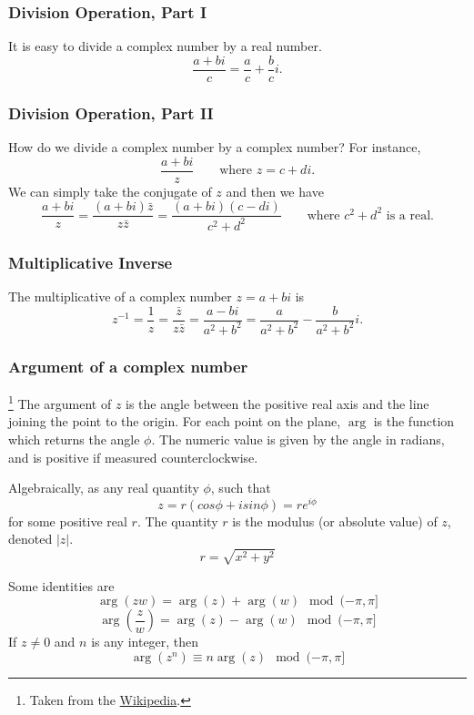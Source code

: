 \documentclass[11pt]{article}
\begin{document}
    \subsubsection{Division Operation, Part I}
    It is easy to divide a complex number by a real number. \[\frac{a+bi}{c} = \frac{a}{c} + \frac{b}{c} i.\]

    \subsubsection{Division Operation, Part II}
    How do we divide a complex number by a complex number? For instance, \[\frac{a+bi}{z} \qquad \text{where } z = c + di.\] We can simply take the conjugate of $z$ and then we have \[\frac{a + bi}{z} = \frac{(a+bi)\bar{z}}{z \bar{z}} = \frac{(a+bi)(c-di)}{c^2 + d^2} \qquad \text{where } c^2 + d^2 \text{ is a real.}\]

    \subsubsection{Multiplicative Inverse}

    The multiplicative of a complex number \(z = a + bi\) is \[z^{-1} = \frac{1}{z} = \frac{\bar{z}}{z \bar{z}} = \frac{a - bi}{a^2 + b^2} = \frac{a}{a^2 + b^2} - \frac{b}{a^2 + b^2}i.\]

    \subsubsection{Argument of a complex number}\footnote{Taken from the \href{https://en.wikipedia.org/wiki/Argument_(complex_analysis)}{Wikipedia}.}
    The argument of $z$ is the angle between the positive real axis and the line joining the point to the origin. For each point on the plane, \(\arg\) is the function which returns the angle \(\phi\). The numeric value is given by the angle in radians, and is positive if measured counterclockwise.

    Algebraically, as any real quantity \(\phi\), such that \[z = r(cos \phi + i sin \phi) = r e^{i \phi}\] for some positive real $r$. The quantity $r$ is the modulus (or absolute value) of $z$, denoted $|z|$. \[r = \sqrt{x^2 + y^2}\]

    Some identities are \[\arg(zw) = \arg(z) + \arg(w) \mod{(-\pi, \pi]}\] \[\arg \left(\frac{z}{w}\right) = \arg(z) - \arg(w) \mod{(-\pi, \pi]}\] If \(z \neq 0\) and $n$ is any integer, then \[\arg(z^n) \equiv n \arg(z) \mod{(-\pi,\pi]}\]
    
\end{document}
